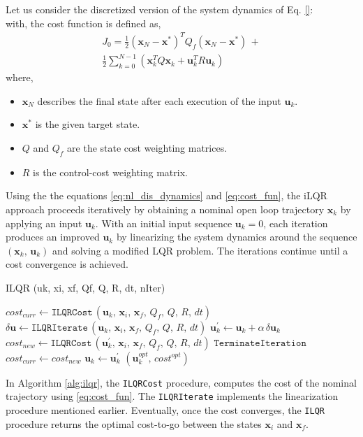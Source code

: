 \documentclass[conference]{IEEEtran}
\newcommand\vx[1]{\mathbf{#1}}
\begin{document}
Let us consider the discretized version of the system dynamics of Eq. \eqref{}:
\begin{equation}\label{eq:nl_dis_dynamics}
\end{equation}
with, the cost function is defined as,
\begin{equation}\label{eq:cost_fun}
\begin{split}
J_{0}=\frac{1}{2}\left(\vx{x}_N-\vx{x}^{*}\right)^TQ_{f}(\vx{x}_N-\vx{x}^{*})\,+\\
\frac{1}{2}\sum_{k=0}^{N-1}\left(\vx{x}_{k}^TQ\vx{x}_{k}+\vx{u}_{k}^TR\vx{u}_{k}\right)
\end{split}
\end{equation}
where,
\begin{itemize}
\item{$\vx{x}_N$ describes the final state after each execution of the input $\vx{u}_k$.}
\item{$\vx{x}^{*}$ is the given target state.}
\item{$Q$ and $Q_f$ are the state cost weighting matrices.}
\item{$R$ is the control-cost weighting matrix.}
\end{itemize}
Using the the equations \eqref{eq:nl_dis_dynamics} and \eqref{eq:cost_fun}, the iLQR approach proceeds iteratively by obtaining a nominal open loop trajectory $\vx{x}_k$ by applying an input $\vx{u}_k$. With an initial input sequence $\vx{u}_{k}=0$, each iteration produces an improved $\vx{u}_k$ by linearizing the system dynamics around the sequence $\left(\vx{x}_k,\,\vx{u}_k\right)$ and solving a modified LQR problem. The iterations continue until a cost convergence is achieved.

\begin{algorithm}
\caption{ILQR (uk, xi, xf, Qf, Q, R, dt, nIter)}
\begin{algorithmic}
\label{alg:ilqr}
\STATE $cost_{curr}\leftarrow\texttt{ILQRCost}\,\left(\vx{u}_k,\,\vx{x}_i,\, \vx{x}_f,\,Q_f,\,Q,\,R,\,dt \right)$
\STATE $\delta\vx{u}\leftarrow\texttt{ILQRIterate}\,\left(\vx{u}_k,\,\vx{x}_i,\, \vx{x}_f,\,Q_f,\,Q,\,R,\,dt \right)$
\STATE $\vx{u}_k^{'}\leftarrow \vx{u}_k+\alpha\,\delta\vx{u}_k$
\STATE $cost_{new}\leftarrow\texttt{ILQRCost}\,\left(\vx{u}_k^{'},\,\vx{x}_i,\, \vx{x}_f,\,Q_f,\,Q,\,R,\,dt \right)$
\STATE$\texttt{TerminateIteration}$
\ENDIF
\STATE $cost_{curr}\leftarrow cost_{new}$
\STATE $\vx{u}_{k}\leftarrow \vx{u}_{k}^{'}$
\ENDFOR
\RETURN $\left(\vx{u}_k^{opt},\,cost^{opt}\right)$
\end{algorithmic}
\end{algorithm}
In Algorithm \ref{alg:ilqr}, the \texttt{ILQRCost} procedure, computes the cost of the nominal trajectory using \eqref{eq:cost_fun}. The \texttt{ILQRIterate} implements the linearization procedure mentioned earlier. Eventually, once the cost converges, the \texttt{ILQR} procedure returns the optimal cost-to-go between the states $\vx{x}_{i}$ and $\vx{x}_{f}$.
\end{document}
